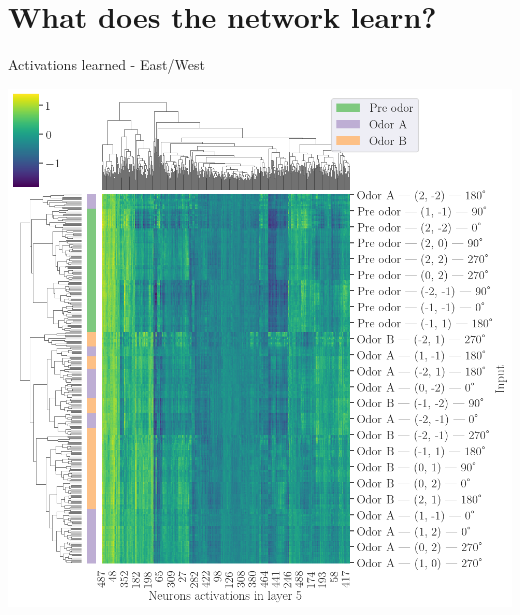 \documentclass[bigger]{beamer}
\begin{document}
\section{What does the network learn?}
\label{sec:org5fb47e4}
\begin{frame}[label={sec:orgf9298d6}]{Activations learned - East/West}
\begin{center}
\includegraphics[height=0.9\textheight]{img/activations-learned-EastWest.png}
\end{center}
\end{frame}
\end{document}
